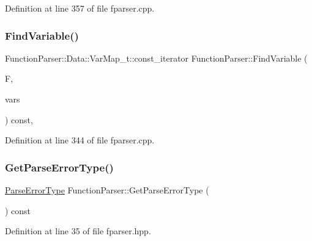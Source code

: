 Definition at line 357 of file fparser.\+cpp.

\mbox{\label{class_function_parser_a1c1ea54f04c1dfb8d8609240ba9f5f40}} 
\subsubsection{\texorpdfstring{Find\+Variable()}{FindVariable()}}
{\footnotesize\ttfamily Function\+Parser\+::\+Data\+::\+Var\+Map\+\_\+t\+::const\+\_\+iterator Function\+Parser\+::\+Find\+Variable (\begin{DoxyParamCaption}\item[{const char $\ast$}]{F,  }\item[{const \hyperlink{struct_function_parser_1_1_data_a02f3fbca3164d0e498312b418258ea84}{Data\+::\+Var\+Map\+\_\+t} \&}]{vars }\end{DoxyParamCaption}) const\hspace{0.3cm}{\ttfamily [inline]}, {\ttfamily [private]}}



Definition at line 344 of file fparser.\+cpp.

\mbox{\label{class_function_parser_ad6ddf1546278fa7148c968374e6a097a}} 
\subsubsection{\texorpdfstring{Get\+Parse\+Error\+Type()}{GetParseErrorType()}}
{\footnotesize\ttfamily \hyperlink{class_function_parser_a0bb74d288d02ba86367cc1c85351c8e7}{Parse\+Error\+Type} Function\+Parser\+::\+Get\+Parse\+Error\+Type (\begin{DoxyParamCaption}{ }\end{DoxyParamCaption}) const\hspace{0.3cm}{\ttfamily [inline]}}



Definition at line 35 of file fparser.\+hpp.

\mbox{\label{class_function_parser_a2ba1bb889a7035da4a7639d6b7ce53c6}} 
